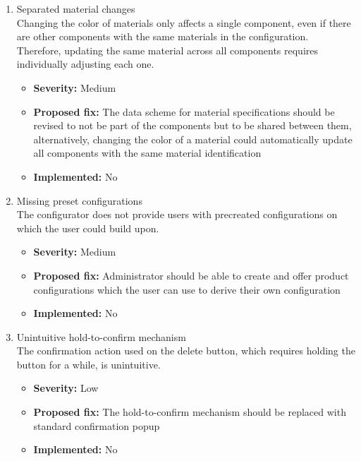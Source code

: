 \begin{enumerate}[label=\textbf{I\arabic*:}, leftmargin=*]
    \item Separated material changes
        \vspace{2pt}
        \\Changing the color of materials only affects a single component, even if there are other components with the same materials in the configuration. Therefore, updating the same material across all components requires \phantom{individually adjusting each one.}\newpage individually adjusting each one.
        \begin{itemize}[noitemsep, label=\trianglebullet]
            \item \textbf{Severity:} Medium
            \item \textbf{Proposed fix:} The data scheme for material specifications should be revised to not be part of the components but to be shared between them, alternatively, changing the color of a material could automatically update all components with the same material identification
            \item \textbf{Implemented:} No
        \end{itemize}
        \vspace{4pt}

    \item Missing preset configurations
        \vspace{2pt}
        \\The configurator does not provide users with precreated configurations on which the user could build upon.
        \begin{itemize}[noitemsep, label=\trianglebullet]
            \item \textbf{Severity:} Medium
            \item \textbf{Proposed fix:} Administrator should be able to create and offer product configurations which the user can use to derive their own configuration
            \item \textbf{Implemented:} No
        \end{itemize}
        \vspace{4pt}

    \item Unintuitive hold-to-confirm mechanism
        \vspace{2pt}
        \\The confirmation action used on the delete button, which requires holding the button for a while, is unintuitive.
        \begin{itemize}[noitemsep, label=\trianglebullet]
            \item \textbf{Severity:} Low
            \item \textbf{Proposed fix:} The hold-to-confirm mechanism should be replaced with standard confirmation popup
            \item \textbf{Implemented:} No
        \end{itemize}
        \vspace{4pt}


\end{enumerate}
